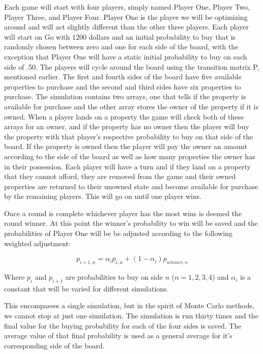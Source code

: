 \documentclass{article}
\begin{document}
Each game will start with four players, simply named Player One, Player Two, Player Three, and Player Four.  Player One is the player we will be optimizing around and will act slightly different than the other three players.  Each player will start on Go with 1200 dollars and an initial probability to buy that is randomly chosen between zero and one for each side of the board, with the exception that Player One will have a static initial probability to buy on each side of .50.  The players will cycle around the board using the transition matrix P, mentioned earlier.  The first and fourth sides of the board have five available properties to purchase and the second and third sides have six properties to purchase.  The simulation contains two arrays, one that tells if the property is available for purchase and the other array stores the owner of the property if it is owned.  When a player lands on a property the game will check both of these arrays for an owner, and if the property has no owner then the player will buy the property with that player’s respective probability to buy on that side of the board.  If the property is owned then the player will pay the owner an amount according to the side of the board as well as how many properties the owner has in their possession.  Each player will have a turn and if they land on a property that they cannot afford, they are removed from the game and their owned properties are returned to their unowned state and become available for purchase by the remaining players.  This will go on until one player wins.  

Once a round is complete whichever player has the most wins is deemed the round winner.  At this point the winner’s probability to win will be saved and the probabilities of Player One will be be adjusted according to the following weighted adjustment:

\begin{equation}
    \label{probability_adjustment}
    p_{i+1,n} = \alpha_i p_{i,n} + (1-\alpha_i)p_{winner,n}
\end{equation}

Where $p_i$ and $p_{i+1}$ are probabilities to buy on side $n$ ($n = 1,2,3,4$) and $\alpha_i$ is a constant that will be varied for different simulations.

This encompasses a single simulation, but in the spirit of Monte Carlo methods, we cannot stop at just one simulation.  The simulation is run thirty times and the final value for the buying probability for each of the four sides is saved.  The average value of that final probability is used as a general average for it's corresponding side of the board.
\end{document}

